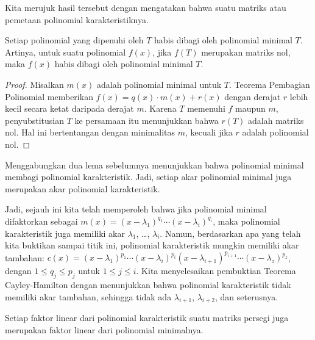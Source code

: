 Kita merujuk hasil tersebut dengan mengatakan bahwa suatu
matriks atau pemetaan
polinomial karakteristiknya.

\begin{lemma} \label{le:tSatisImpMinPolyDivides}
Setiap polinomial yang dipenuhi oleh \( T \) habis dibagi oleh
polinomial minimal \( T \).
Artinya, untuk suatu polinomial \( f(x) \), jika \( f(T) \) merupakan matriks nol,
maka \( f(x) \) habis dibagi oleh polinomial minimal \( T \).
\end{lemma}

\begin{proof}
Misalkan \( m(x) \) adalah polinomial minimal untuk \( T \).
Teorema Pembagian Polinomial memberikan
\( f(x)=q(x)\cdot m(x)+r(x) \)
dengan derajat \( r \) lebih kecil secara ketat daripada derajat \( m \).
Karena $T$ memenuhi $f$ maupun $m$, penyubstitusian $T$ ke persamaan itu
menunjukkan bahwa \( r(T) \) adalah matriks nol.
Hal ini bertentangan dengan minimalitas \( m \), kecuali jika \( r \)
adalah polinomial nol.
\end{proof}

Menggabungkan dua lema sebelumnya menunjukkan bahwa polinomial minimal
membagi polinomial karakteristik.
Jadi,
setiap akar polinomial minimal juga merupakan akar polinomial
karakteristik.

Jadi, sejauh ini kita telah memperoleh bahwa jika polinomial minimal difaktorkan sebagai
\( m(x)=(x-\lambda_1)^{q_1}\cdots(x-\lambda_i)^{q_i} \), maka
polinomial karakteristik juga memiliki akar \( \lambda_1\), \ldots,
\( \lambda_i \).
Namun, berdasarkan apa yang telah kita buktikan sampai titik ini,
polinomial karakteristik mungkin memiliki akar tambahan:
\( c(x)=(x-\lambda_1)^{p_1}\cdots(x-\lambda_i)^{p_i}
     (x-\lambda_{i+1})^{p_{i+1}}\cdots(x-\lambda_z)^{p_z} \), dengan
\( 1\leq q_j\leq p_j \) untuk \( 1\leq j \leq i \).
Kita menyelesaikan pembuktian Teorema Cayley-Hamilton dengan menunjukkan bahwa
polinomial karakteristik tidak memiliki akar tambahan, sehingga
tidak ada $\lambda_{i+1}$, $\lambda_{i+2}$, dan seterusnya.

\begin{lemma}
Setiap faktor linear dari polinomial karakteristik suatu matriks persegi
juga merupakan faktor linear dari polinomial minimalnya.
\end{lemma}


